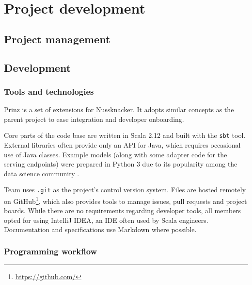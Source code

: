 \chapter{Project development}
\label{chap:project-development}


\section{Project management}


\section{Development}

\subsection{Tools and technologies}

Prinz is a set of extensions for Nussknacker.
It adopts similar concepts as the parent project to ease integration and developer onboarding.

Core parts of the code base are written in Scala 2.12 and built with the \texttt{sbt} tool.
External libraries often provide only an API for Java, which requires occasional use of Java classes.
Example models (along with some adapter code for the serving endpoints) were prepared in Python 3 due to its popularity among the data science community \cite{srinath2017python}.

Team uses \texttt{.git} as the project's control version system.
Files are hosted remotely on GitHub\footnote{\href{https://github.com/}{https://github.com/}}, which also provides tools to manage issues, pull requests and project boards.
While there are no requirements regarding developer tools, all members opted for using IntelliJ IDEA, an IDE often used by Scala engineers.
Documentation and specifications use Markdown where possible.

\subsection{Programming workflow}

